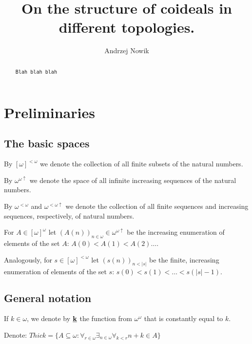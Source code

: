\documentclass[12pt]{amsart}
\author{Andrzej Nowik}
\theoremstyle{plain}
\theoremstyle{definition}
\theoremstyle{remark}
\newcommand{\baire}{\omega^{\omega}}
\newcommand{\dummy}{{\tt Blah blah blah}}
\newcommand{\finsub}{[\omega]^{<\omega}}
\newcommand{\finbaire}{\omega^{<\omega}}
\newcommand{\finincrbaire}{\omega^{< \omega \uparrow}}
\newcommand{\incrbaire}{\omega^{\omega \uparrow}}
\newcommand{\infsub}{[\omega]^{\omega}}
\newcommand{\Thick}{{\mathit Thick}}
\begin{document}
\title[
On the structure...
]{
On the structure of coideals in different topologies.
}

\begin{abstract}
\dummy
\end{abstract}

\maketitle

\section{Preliminaries}
\subsection{The basic spaces}
By $\finsub$ we denote the collection of all finite subsets of the
natural numbers.

By $\incrbaire$ we denote the space of all infinite increasing
sequences of the natural numbers.

By $\finbaire$ and $\finincrbaire$
we denote the collection of all finite sequences and increasing
sequences, respectively, of natural numbers.

For $A \in \infsub$ let
$(A(n))_{n\in\omega} \in \incrbaire$ be the increasing enumeration
of elements of the set $A$: $A(0) < A(1) < A(2) \ldots$.

Analogously, for $s \in \finsub$ let
$(s(n))_{n < |s|}$ be the finite, increasing enumeration
of elements of the set $s$: $s(0) < s(1) < \ldots < s(|s| - 1)$.

\subsection{General notation}
If $k\in\omega$, we denote by $\underline{\bf k}$ the 
function from $\baire$ that is constantly equal to $k$.

Denote:
$\Thick = \lbrace A \subseteq \omega\colon \forall_{r\in\omega}
\exists_{n \in \omega} \forall_{k < r} n + k \in A\rbrace$
\end{document}
